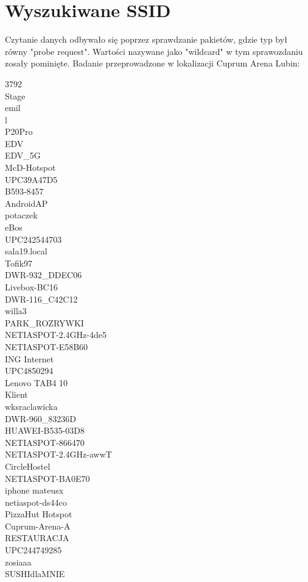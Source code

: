 \documentclass[12pt,a4paper]{article}
\begin{document}
    \section{Wyszukiwane SSID}
        Czytanie danych odbywało się poprzez sprawdzanie pakietów, gdzie typ był równy "probe request". 
        Wartości nazywane jako "wildcard" w tym sprawozdaniu zosały pominięte.
        Badanie przeprowadzone w lokalizacji Cuprum Arena Lubin:\\
        \begin{small}
            \begin{multicols}{3}
                3792\\Stage\\emil\\l\\P20Pro\\EDV\\EDV\_5G\\McD-Hotspot\\UPC39A47D5\\B593-8457\\AndroidAP\\
                potaczek\\eBos\\UPC242544703\\sala19.local\\Tofik97\\DWR-932\_DDEC06\\
                Livebox-BC16\\DWR-116\_C42C12\\willa3\\PARK\_ROZRYWKI\\NETIASPOT-2.4GHz-4de5\\NETIASPOT-E58B60\\
                ING Internet\\UPC4850294\\Lenovo TAB4 10\\Klient\\wksraclawicka\\DWR-960\_83236D\\HUAWEI-B535-03D8\\
                NETIASPOT-866470\\NETIASPOT-2.4GHz-awwT\\CircleHostel\\NETIASPOT-BA0E70\\iphone mateusx\\
                netiaspot-ds44co\\PizzaHut Hotspot\\Cuprum-Arena-A\\RESTAURACJA\\UPC244749285\\zosiaaa\\SUSHIdlaMNIE\\

\end{multicols}
\end{small}
\end{document}
